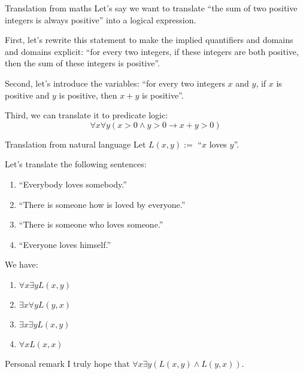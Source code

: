 \documentclass{article}
\begin{document}
\begin{parag}{Translation from maths}
    Let's say we want to translate ``the sum of two positive integers is always positive'' into a logical expression.

    First, let's rewrite this statement to make the implied quantifiers and domains and domains explicit: ``for every two integers, if these integers are both positive, then the sum of these integers is positive''.

    Second, let's introduce the variables: ``for every two integers $x$ and $y$, if $x$ is positive and $y$ is positive, then $x+y$ is positive''.

    Third, we can translate it to predicate logic: 
    \[\forall x \forall y\left(x > 0 \land y > 0 \to x + y > 0\right)\]
\end{parag}


\begin{parag}{Translation from natural language}
    Let $L\left(x, y\right) := $ ``$x$ loves $y$''.

    Let's translate the following sentences:
    \begin{enumerate}
        \item ``Everybody loves somebody.''
        \item ``There is someone how is loved by everyone.''
        \item ``There is someone who loves someone.''
        \item ``Everyone loves himself.''
    \end{enumerate}

    We have:
    \begin{enumerate}
        \item $\forall x \exists y L\left(x, y\right)$
        \item $\exists x \forall y L\left(y, x\right)$
        \item $\exists x \exists y L\left(x, y\right)$
        \item $\forall x L\left(x, x\right)$
    \end{enumerate}
   
    \begin{subparag}{Personal remark}
        I truly hope that $\forall x \exists y \left(L\left(x, y\right) \land L\left(y, x\right)\right)$.
    \end{subparag}
\end{parag}
\end{document}
